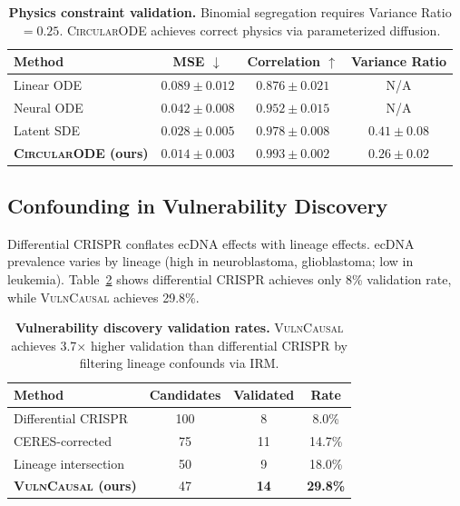 \documentclass[sigconf,anonymous]{acmart}
\newcommand{\circularode}{\textsc{CircularODE}}
\newcommand{\vulncausal}{\textsc{VulnCausal}}
\begin{document}
\begin{table}[t]
\caption{\textbf{Physics constraint validation.} Binomial segregation requires Variance Ratio $= 0.25$. \circularode{} achieves correct physics via parameterized diffusion.}
\label{tab:physics}
\centering
\small
\begin{tabular}{@{}lccc@{}}
\toprule
Method & MSE $\downarrow$ & Correlation $\uparrow$ & Variance Ratio \\
\midrule
Linear ODE & $0.089 \pm 0.012$ & $0.876 \pm 0.021$ & N/A \\
Neural ODE & $0.042 \pm 0.008$ & $0.952 \pm 0.015$ & N/A \\
Latent SDE & $0.028 \pm 0.005$ & $0.978 \pm 0.008$ & $0.41 \pm 0.08$ \\
\textbf{\circularode{} (ours)} & $\mathbf{0.014 \pm 0.003}$ & $\mathbf{0.993 \pm 0.002}$ & $\mathbf{0.26 \pm 0.02}$ \\
\bottomrule
\end{tabular}
\end{table}

\subsection{Confounding in Vulnerability Discovery}
\label{sec:confounding}

Differential CRISPR conflates ecDNA effects with lineage effects. ecDNA prevalence varies by lineage (high in neuroblastoma, glioblastoma; low in leukemia). Table~\ref{tab:confounding} shows differential CRISPR achieves only 8\% validation rate, while \vulncausal{} achieves 29.8\%.

\begin{table}[t]
\caption{\textbf{Vulnerability discovery validation rates.} \vulncausal{} achieves 3.7$\times$ higher validation than differential CRISPR by filtering lineage confounds via IRM.}
\label{tab:confounding}
\centering
\small
\begin{tabular}{@{}lccc@{}}
\toprule
Method & Candidates & Validated & Rate \\
\midrule
Differential CRISPR & 100 & 8 & 8.0\% \\
CERES-corrected & 75 & 11 & 14.7\% \\
Lineage intersection & 50 & 9 & 18.0\% \\
\textbf{\vulncausal{} (ours)} & 47 & \textbf{14} & \textbf{29.8\%} \\
\bottomrule
\end{tabular}
\end{table}
\end{document}
